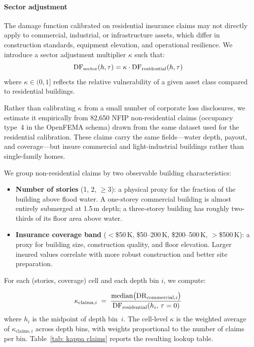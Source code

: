 \paragraph{Sector adjustment}
The damage function calibrated on residential insurance claims may not directly apply to commercial, industrial, or infrastructure assets, which differ in construction standards, equipment elevation, and operational resilience. We introduce a sector adjustment multiplier $\kappa$ such that:
\begin{equation*}
    \text{DF}_{\text{sector}}(h, \tau) = \kappa \cdot \text{DF}_{\text{residential}}(h, \tau)
\end{equation*}
where $\kappa \in (0, 1]$ reflects the relative vulnerability of a given asset class compared to residential buildings.

Rather than calibrating $\kappa$ from a small number of corporate loss disclosures, we estimate it empirically from 82{,}650 NFIP non-residential claims (occupancy type~4 in the OpenFEMA schema) drawn from the same dataset used for the residential calibration. These claims carry the same fields---water depth, payout, and coverage---but insure commercial and light-industrial buildings rather than single-family homes.

We group non-residential claims by two observable building characteristics:

\begin{itemize}
    \item \textbf{Number of stories} (1, 2, $\geq$3): a physical proxy for the fraction of the building above flood water. A one-storey commercial building is almost entirely submerged at 1.5\,m depth; a three-storey building has roughly two-thirds of its floor area above water.
    \item \textbf{Insurance coverage band} ($<$\$50\,K, \$50--200\,K, \$200--500\,K, $>$\$500\,K): a proxy for building size, construction quality, and floor elevation. Larger insured values correlate with more robust construction and better site preparation.
\end{itemize}

For each (stories, coverage) cell and each depth bin $i$, we compute:

\begin{equation*}
    \kappa_{\text{claims},i}
    \;=\;
    \frac{\mathrm{median}\bigl(\mathrm{DR}_{\text{commercial},i}\bigr)}
         {\text{DF}_{\text{residential}}(h_i,\,\tau=0)}
\end{equation*}
where $h_i$ is the midpoint of depth bin~$i$. The cell-level $\kappa$ is the weighted average of $\kappa_{\text{claims},i}$ across depth bins, with weights proportional to the number of claims per bin. Table~\ref{tab: kappa claims} reports the resulting lookup table.

